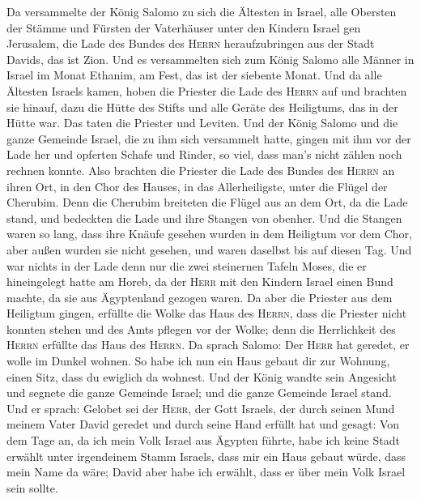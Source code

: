  Da versammelte der König Salomo zu sich die Ältesten in
Israel, alle Obersten der Stämme und Fürsten der Vaterhäuser unter den
Kindern Israel gen Jerusalem, die Lade des Bundes des \textsc{Herrn}
heraufzubringen aus der Stadt Davids, das ist Zion.  Und
es versammelten sich zum König Salomo alle Männer in Israel im Monat
Ethanim, am Fest, das ist der siebente Monat.  Und da alle
Ältesten Israels kamen, hoben die Priester die Lade des \textsc{Herrn}
auf  und brachten sie hinauf, dazu die Hütte des Stifts
und alle Geräte des Heiligtums, das in der Hütte war. Das taten die
Priester und Leviten.  Und der König Salomo und die ganze
Gemeinde Israel, die zu ihm sich versammelt hatte, gingen mit ihm vor
der Lade her und opferten Schafe und Rinder, so viel, dass man's nicht
zählen noch rechnen konnte.  Also brachten die Priester
die Lade des Bundes des \textsc{Herrn} an ihren Ort, in den Chor des
Hauses, in das Allerheiligste, unter die Flügel der Cherubim.
 Denn die Cherubim breiteten die Flügel aus an dem Ort, da
die Lade stand, und bedeckten die Lade und ihre Stangen von obenher.
 Und die Stangen waren so lang, dass ihre Knäufe gesehen
wurden in dem Heiligtum vor dem Chor, aber außen wurden sie nicht
gesehen, und waren daselbst bis auf diesen Tag.  Und war
nichts in der Lade denn nur die zwei steinernen Tafeln Moses, die er
hineingelegt hatte am Horeb, da der \textsc{Herr} mit den Kindern Israel
einen Bund machte, da sie aus Ägyptenland gezogen waren. 
Da aber die Priester aus dem Heiligtum gingen, erfüllte die Wolke das
Haus des \textsc{Herrn},  dass die Priester nicht konnten
stehen und des Amts pflegen vor der Wolke; denn die Herrlichkeit des
\textsc{Herrn} erfüllte das Haus des \textsc{Herrn}.  Da
sprach Salomo: Der \textsc{Herr} hat geredet, er wolle im Dunkel wohnen.
 So habe ich nun ein Haus gebaut dir zur Wohnung, einen
Sitz, dass du ewiglich da wohnest.  Und der König wandte
sein Angesicht und segnete die ganze Gemeinde Israel; und die ganze
Gemeinde Israel stand.  Und er sprach: Gelobet sei der
\textsc{Herr}, der Gott Israels, der durch seinen Mund meinem Vater
David geredet und durch seine Hand erfüllt hat und gesagt:
 Von dem Tage an, da ich mein Volk Israel aus Ägypten
führte, habe ich keine Stadt erwählt unter irgendeinem Stamm Israels,
dass mir ein Haus gebaut würde, dass mein Name da wäre; David aber habe
ich erwählt, dass er über mein Volk Israel sein sollte.

